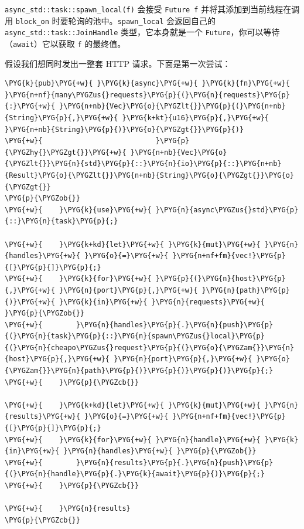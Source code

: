 \texttt{async\_std::task::spawn\_local(f)} 会接受 \texttt{Future f} 并将其添加到当前线程在调用 \texttt{block\_on} 时要轮询的池中。\texttt{spawn\_local} 会返回自己的 \texttt{async\_std::task::JoinHandle} 类型，它本身就是一个 \texttt{Future}，你可以等待（\texttt{await}）它以获取 \texttt{f} 的最终值。

假设我们想同时发出一整套 HTTP 请求。下面是第一次尝试：

\begin{Verbatim}[commandchars=\\\{\},breaklines=true,breakanywhere=true,fontsize=\codefont,xleftmargin=17bp]
\PYG{k}{pub}\PYG{+w}{ }\PYG{k}{async}\PYG{+w}{ }\PYG{k}{fn}\PYG{+w}{ }\PYG{n+nf}{many\PYGZus{}requests}\PYG{p}{(}\PYG{n}{requests}\PYG{p}{:}\PYG{+w}{ }\PYG{n+nb}{Vec}\PYG{o}{\PYGZlt{}}\PYG{p}{(}\PYG{n+nb}{String}\PYG{p}{,}\PYG{+w}{ }\PYG{k+kt}{u16}\PYG{p}{,}\PYG{+w}{ }\PYG{n+nb}{String}\PYG{p}{)}\PYG{o}{\PYGZgt{}}\PYG{p}{)}
\PYG{+w}{                           }\PYG{p}{\PYGZhy{}\PYGZgt{}}\PYG{+w}{ }\PYG{n+nb}{Vec}\PYG{o}{\PYGZlt{}}\PYG{n}{std}\PYG{p}{::}\PYG{n}{io}\PYG{p}{::}\PYG{n+nb}{Result}\PYG{o}{\PYGZlt{}}\PYG{n+nb}{String}\PYG{o}{\PYGZgt{}}\PYG{o}{\PYGZgt{}}
\PYG{p}{\PYGZob{}}
\PYG{+w}{    }\PYG{k}{use}\PYG{+w}{ }\PYG{n}{async\PYGZus{}std}\PYG{p}{::}\PYG{n}{task}\PYG{p}{;}

\PYG{+w}{    }\PYG{k+kd}{let}\PYG{+w}{ }\PYG{k}{mut}\PYG{+w}{ }\PYG{n}{handles}\PYG{+w}{ }\PYG{o}{=}\PYG{+w}{ }\PYG{n+nf+fm}{vec!}\PYG{p}{[}\PYG{p}{]}\PYG{p}{;}
\PYG{+w}{    }\PYG{k}{for}\PYG{+w}{ }\PYG{p}{(}\PYG{n}{host}\PYG{p}{,}\PYG{+w}{ }\PYG{n}{port}\PYG{p}{,}\PYG{+w}{ }\PYG{n}{path}\PYG{p}{)}\PYG{+w}{ }\PYG{k}{in}\PYG{+w}{ }\PYG{n}{requests}\PYG{+w}{ }\PYG{p}{\PYGZob{}}
\PYG{+w}{        }\PYG{n}{handles}\PYG{p}{.}\PYG{n}{push}\PYG{p}{(}\PYG{n}{task}\PYG{p}{::}\PYG{n}{spawn\PYGZus{}local}\PYG{p}{(}\PYG{n}{cheapo\PYGZus{}request}\PYG{p}{(}\PYG{o}{\PYGZam{}}\PYG{n}{host}\PYG{p}{,}\PYG{+w}{ }\PYG{n}{port}\PYG{p}{,}\PYG{+w}{ }\PYG{o}{\PYGZam{}}\PYG{n}{path}\PYG{p}{)}\PYG{p}{)}\PYG{p}{)}\PYG{p}{;}
\PYG{+w}{    }\PYG{p}{\PYGZcb{}}

\PYG{+w}{    }\PYG{k+kd}{let}\PYG{+w}{ }\PYG{k}{mut}\PYG{+w}{ }\PYG{n}{results}\PYG{+w}{ }\PYG{o}{=}\PYG{+w}{ }\PYG{n+nf+fm}{vec!}\PYG{p}{[}\PYG{p}{]}\PYG{p}{;}
\PYG{+w}{    }\PYG{k}{for}\PYG{+w}{ }\PYG{n}{handle}\PYG{+w}{ }\PYG{k}{in}\PYG{+w}{ }\PYG{n}{handles}\PYG{+w}{ }\PYG{p}{\PYGZob{}}
\PYG{+w}{        }\PYG{n}{results}\PYG{p}{.}\PYG{n}{push}\PYG{p}{(}\PYG{n}{handle}\PYG{p}{.}\PYG{k}{await}\PYG{p}{)}\PYG{p}{;}
\PYG{+w}{    }\PYG{p}{\PYGZcb{}}

\PYG{+w}{    }\PYG{n}{results}
\PYG{p}{\PYGZcb{}}
\end{Verbatim}

